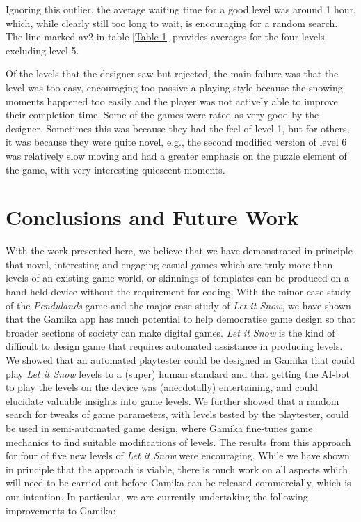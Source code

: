 \documentclass{IEEEtran}
\begin{document}
Ignoring this outlier, the average waiting time for a good level was around 1 hour, which, while clearly still too long to wait, is encouraging for a random search. The line marked av2 in table \ref{Table 1} provides averages for the four levels excluding level 5.

Of the levels that the designer saw but rejected, the main failure was that the level was too easy, encouraging too passive a playing style because the snowing moments happened too easily and the player was not actively able to improve their completion time. Some of the games were rated as very good by the designer. Sometimes this was because they had the feel of level 1, but for others, it was because they were quite novel, e.g., the second modified version of level 6 was relatively slow moving and had a greater emphasis on the puzzle element of the game, with very interesting quiescent moments.


\section{Conclusions and Future Work}
\label{Section:7}
With the work presented here, we believe that we have demonstrated in principle that novel, interesting and engaging casual games which are truly more than levels of an existing game world, or skinnings of templates can be produced on a hand-held device without the requirement for coding. With the minor case study of the \emph{Pendulands} game and the major case study of \emph{Let it Snow}, we have shown that the Gamika app has much potential to help democratise game design so that broader sections of society can make digital games. \emph{Let it Snow} is the kind of difficult to design game that requires automated assistance in producing levels. We showed that an automated playtester could be designed in Gamika that could play \emph{Let it Snow} levels to a (super) human standard and that getting the AI-bot to play the levels on the device was (anecdotally) entertaining, and could elucidate valuable insights into game levels. We further showed that a random search for tweaks of game parameters, with levels tested by the playtester, could be used in semi-automated game design, where Gamika fine-tunes game mechanics to find suitable modifications of levels. The results from this approach for four of five new levels of \emph{Let it Snow} were encouraging.
While we have shown in principle that the approach is viable, there is much work on all aspects which will need to be carried out before Gamika can be released commercially, which is our intention. In particular, we are currently undertaking the following improvements to Gamika:
\end{document}
